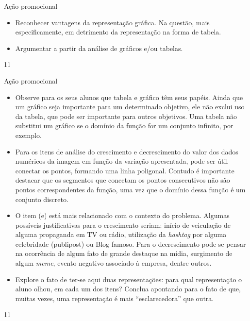 \cleardoublepage
\def\currentcolor{session1}
\begin{objectives}{Ação promocional}
{
\begin{itemize}

\item Reconhecer vantagens da representação gráfica. Na questão, mais especificamente, em detrimento da representação na forma de tabela.

\item Argumentar a partir da análise de gráficos e/ou tabelas.

\end{itemize}
}{1}{1}
\end{objectives}
\begin{sugestions}{Ação promocional}
{
\begin{itemize}
\item Observe para os seus alunos que tabela e gráfico têm seus papéis. Ainda que um gráfico seja importante para um determinado objetivo, ele não exclui uso da tabela, que pode ser importante para outros objetivos. Uma tabela não substitui um gráfico se o domínio da função for um conjunto infinito, por exemplo.

\item Para os itens de análise do crescimento e decrescimento do valor dos dados numéricos da imagem em função da variação apresentada, pode ser útil conectar os pontos, formando uma linha poligonal. Contudo é importante destacar que os segmentos que conectam os pontos consecutivos não são pontos correspondentes da função, uma vez que o domínio dessa função é um conjunto discreto.

\item O item (e) está mais relacionado com o contexto do problema. Algumas possíveis justificativas para o crescimento seriam: início de veiculação de alguma propaganda em TV ou rádio, utilização da \textit{hashtag} por alguma celebridade (publipost) ou Blog famoso. Para o decrescimento pode-se pensar na ocorrência de algum fato de grande destaque na mídia, surgimento de algum \textit{meme}, evento negativo associado à empresa, dentre outros.

\item Explore o fato de ter-se aqui duas representações: para qual representação o aluno olhou, em cada um dos itens? Conclua apontando para o fato de que, muitas vezes, uma representação é mais “esclarecedora” que outra.
\end{itemize}
}{1}{1}
\end{sugestions}
